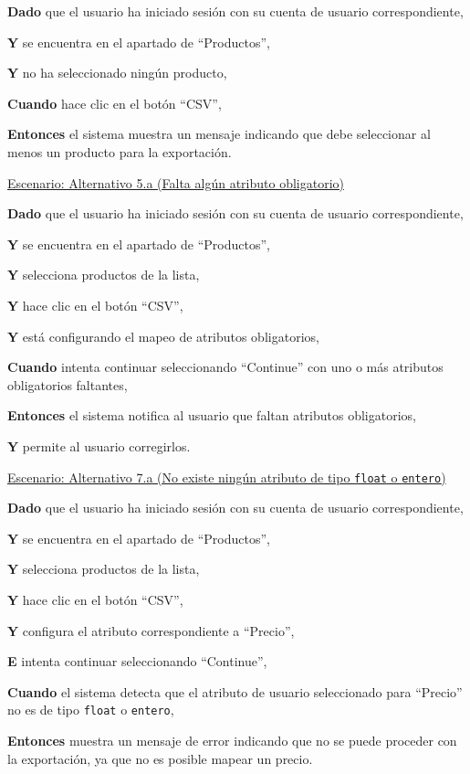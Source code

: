 \textbf{Dado} que el usuario ha iniciado sesión con su cuenta de usuario correspondiente,\par
\textbf{Y} se encuentra en el apartado de \enquote{Productos},\par 
\textbf{Y} no ha seleccionado ningún producto,\par
\textbf{Cuando} hace clic en el botón \enquote{CSV},\par
\textbf{Entonces} el sistema muestra un mensaje indicando que debe seleccionar al menos un producto para la exportación.\par
\vspace{0.15cm}
\underline{Escenario: Alternativo 5.a (Falta algún atributo obligatorio)}\par
\textbf{Dado} que el usuario ha iniciado sesión con su cuenta de usuario correspondiente,\par
\textbf{Y} se encuentra en el apartado de \enquote{Productos},\par 
\textbf{Y} selecciona productos de la lista,\par
\textbf{Y} hace clic en el botón \enquote{CSV},\par
\textbf{Y} está configurando el mapeo de atributos obligatorios,\par
\textbf{Cuando} intenta continuar seleccionando \enquote{Continue} con uno o más atributos obligatorios faltantes,\par
\textbf{Entonces} el sistema notifica al usuario que faltan atributos obligatorios,\par
\textbf{Y} permite al usuario corregirlos.\par
\vspace{0.15cm}
\underline{Escenario: Alternativo 7.a (No existe ningún atributo de tipo \texttt{float} o \texttt{entero})}\par
\textbf{Dado} que el usuario ha iniciado sesión con su cuenta de usuario correspondiente,\par
\textbf{Y} se encuentra en el apartado de \enquote{Productos},\par
\textbf{Y} selecciona productos de la lista,\par
\textbf{Y} hace clic en el botón \enquote{CSV},\par
\textbf{Y} configura el atributo correspondiente a \enquote{Precio},\par
\textbf{E} intenta continuar seleccionando \enquote{Continue},\par
\textbf{Cuando} el sistema detecta que el atributo de usuario seleccionado para \enquote{Precio} no es de tipo \texttt{float} o \texttt{entero},\par
\textbf{Entonces} muestra un mensaje de error indicando que no se puede proceder con la exportación, ya que no es posible mapear un precio.\par

